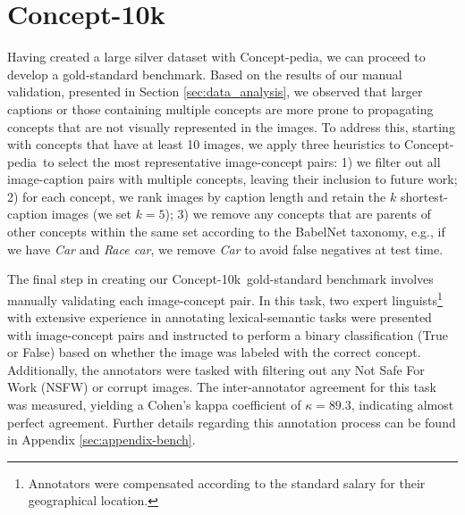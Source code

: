 \documentclass[11pt]{article}
\newcommand{\resource}{Concept-pedia}
\newcommand{\benchmark}{Concept-10k}
\begin{document}
\section{Concept-10k}
\label{sec:concept-10k}
Having created a large silver dataset with \resource, we can proceed to develop a gold-standard benchmark. 
Based on the results of our manual validation, presented in Section \ref{sec:data_analysis}, we observed that larger captions or those containing multiple concepts are more prone to propagating concepts that are not visually represented in the images. 
To address this, starting with concepts that have at least 10 images, we apply three heuristics to \resource~to select the most representative image-concept pairs:
1) we filter out all image-caption pairs with multiple concepts, leaving their inclusion to future work;
2) for each concept, we rank images by caption length and retain the $k$ shortest-caption images (we set $k=5$); 
3) we remove any concepts that are parents of other concepts within the same set according to the BabelNet taxonomy, e.g., if we have \textit{Car} and \textit{Race car}, we remove \textit{Car} to avoid false negatives at test time.

The final step in creating our \benchmark~gold-standard benchmark involves manually validating each image-concept pair.
In this task, two expert linguists\footnote{Annotators were compensated according to the standard salary for their geographical location.} with extensive experience in annotating lexical-semantic tasks were presented with image-concept pairs and instructed to perform a binary classification (True or False) based on whether the image was labeled with the correct concept. 
Additionally, the annotators were tasked with filtering out any Not Safe For Work (NSFW) or corrupt images.
The inter-annotator agreement for this task was measured, yielding a Cohen’s kappa coefficient of $\kappa = 89.3$, indicating almost perfect agreement.
Further details regarding this annotation process can be found in Appendix \ref{sec:appendix-bench}.

\end{document}
